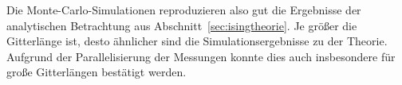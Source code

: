 	Die Monte-Carlo-Simulationen reproduzieren also gut die Ergebnisse der analytischen Betrachtung aus Abschnitt~\ref{sec:isingtheorie}. Je größer die Gitterlänge ist, desto ähnlicher sind die Simulationsergebnisse zu der Theorie. Aufgrund der Parallelisierung der Messungen konnte dies auch insbesondere für große Gitterlängen bestätigt werden.
	
	
%	
%			
%			
%			
	
	
	
